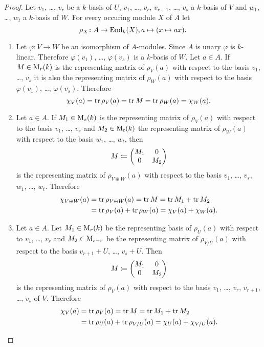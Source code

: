 \begin{proof}
 Let $v_1$, \dots, $v_r$ be a $k$-basis of $U$, $v_1$, \dots, $v_r$, $v_{r+1}$, \dots, $v_s$ a $k$-basis of $V$ and $w_1$, \dots, $w_t$ a $k$-basis of $W$. For every occuring module $X$ of $A$ let
 \[
  \rho_X \colon A \to \operatorname{End}_k(X), a \mapsto (x \mapsto ax).
 \]
 \begin{enumerate}[label=\emph{\alph*})]
  \item
   Let $\varphi \colon V \to W$ be an isomorphism of $A$-modules. Since $A$ is unary $\varphi$ is $k$-linear. Therefore $\varphi(v_1)$, \dots, $\varphi(v_s)$ is a $k$-basis of $W$. Let $a \in A$. If $M \in \operatorname{M}_r(k)$ is the representing matrix of $\rho_V(a)$ with respect to the basis $v_1$, \dots, $v_s$ it is also the representing matrix of $\rho_W(a)$ with respect to the basis $\varphi(v_1)$, \dots, $\varphi(v_s)$. Therefore
   \[
    \chi_V(a) = \operatorname{tr} \rho_V(a) = \operatorname{tr} M = \operatorname{tr} \rho_W(a) = \chi_W(a).
   \]
  \item
   Let $a \in A$. If $M_1 \in \operatorname{M}_s(k)$ is the representing matrix of $\rho_V(a)$ with respect to the basis $v_1$, \dots, $v_s$ and $M_2 \in \operatorname{M}_t(k)$ the representing matrix of $\rho_W(a)$ with respect to the basis $w_1$, \dots, $w_t$, then
   \[
    M \coloneqq \begin{pmatrix}M_1 & 0  \\ 0 & M_2\end{pmatrix}
   \]
   is the representing matrix of $\rho_{V \oplus W}(a)$ with respect to the basis $v_1$, \dots, $v_s$, $w_1$, \dots, $w_t$. Therefore
   \begin{align*}
    \chi_{V \oplus W}(a)
    &= \operatorname{tr} \rho_{V \oplus W}(a)
    = \operatorname{tr} M
    = \operatorname{tr} M_1 + \operatorname{tr} M_2 \\
    &= \operatorname{tr} \rho_V(a) + \operatorname{tr} \rho_W(a)
    = \chi_V(a) + \chi_W(a).
   \end{align*}
  \item
   Let $a \in A$. Let $M_1 \in \operatorname{M}_r(k)$ be the representing basis of $\rho_U(a)$ with respect to $v_1$, \dots, $v_r$ and $M_2 \in \operatorname{M}_{s-r}$ be the representing matrix of $\rho_{V/U}(a)$ with respect to the basis $v_{r+1} + U$, \dots, $v_s + U$. Then
   \[
    M \coloneqq \begin{pmatrix}M_1 & 0 \\ 0 & M_2\end{pmatrix}
   \]
   is the representing matrix of $\rho_V(a)$ with respect to the basis $v_1$, \dots, $v_r$, $v_{r+1}$, \dots, $v_s$ of $V$. Therefore
   \begin{align*}
    \chi_V(a)
    &= \operatorname{tr} \rho_V(a)
    = \operatorname{tr} M
    = \operatorname{tr} M_1 + \operatorname{tr} M_2 \\
    &= \operatorname{tr} \rho_U(a) + \operatorname{tr} \rho_{V/U}(a)
    = \chi_U(a) + \chi_{V/U}(a).
   \end{align*}

\end{enumerate}
\end{proof}
